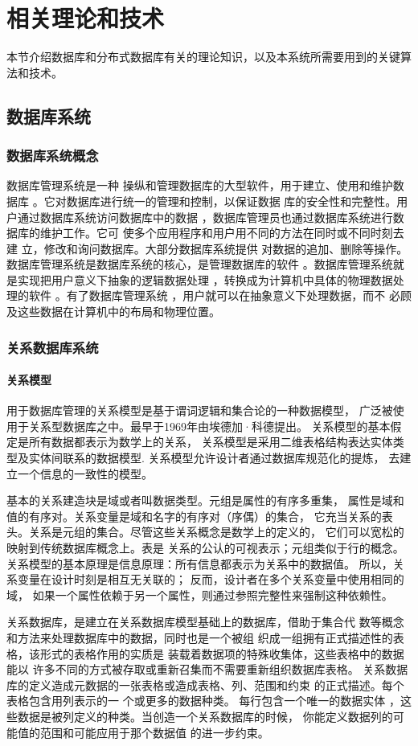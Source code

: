 
\chapter{相关理论和技术}
本节介绍数据库和分布式数据库有关的理论知识，以及本系统所需要用到的关键算法和技术。
\section{数据库系统}
\subsection{数据库系统概念}
数据库管理系统是一种
操纵和管理数据库的大型软件，用于建立、使用和维护数据库
。它对数据库进行统一的管理和控制，以保证数据
库的安全性和完整性。用户通过数据库系统访问数据库中的数据
，数据库管理员也通过数据库系统进行数据库的维护工作。它可
使多个应用程序和用户用不同的方法在同时或不同时刻去建
立，修改和询问数据库。大部分数据库系统提供
对数据的追加、删除等操作。
数据库管理系统是数据库系统的核心，是管理数据库的软件
。数据库管理系统就是实现把用户意义下抽象的逻辑数据处理
，转换成为计算机中具体的物理数据处理的软件
。有了数据库管理系统
，用户就可以在抽象意义下处理数据，而不
必顾及这些数据在计算机中的布局和物理位置。
\subsection{关系数据库系统}
\subsubsection{关系模型}
用于数据库管理的关系模型是基于谓词逻辑和集合论的一种数据模型，
广泛被使用于关系型数据库之中。最早于1969年由埃德加·科德提出。
关系模型的基本假定是所有数据都表示为数学上的关系，
关系模型是采用二维表格结构表达实体类型及实体间联系的数据模型.
关系模型允许设计者通过数据库规范化的提炼，
去建立一个信息的一致性的模型。

基本的关系建造块是域或者叫数据类型。元组是属性的有序多重集，
属性是域和值的有序对。关系变量是域和名字的有序对（序偶）的集合，
它充当关系的表头。关系是元组的集合。尽管这些关系概念是数学上的定义的，
它们可以宽松的映射到传统数据库概念上。表是
关系的公认的可视表示；元组类似于行的概念。
关系模型的基本原理是信息原理：所有信息都表示为关系中的数据值。
所以，关系变量在设计时刻是相互无关联的；
反而，设计者在多个关系变量中使用相同的域，
如果一个属性依赖于另一个属性，则通过参照完整性来强制这种依赖性。

关系数据库，是建立在关系数据库模型基础上的数据库，借助于集合代
数等概念和方法来处理数据库中的数据，同时也是一个被组
织成一组拥有正式描述性的表格，该形式的表格作用的实质是
装载着数据项的特殊收集体，这些表格中的数据能以
许多不同的方式被存取或重新召集而不需要重新组织数据库表格。
关系数据库的定义造成元数据的一张表格或造成表格、列、范围和约束
的正式描述。每个表格包含用列表示的一
个或更多的数据种类。 每行包含一个唯一的数据实体
，这些数据是被列定义的种类。当创造一个关系数据库的时候，
你能定义数据列的可能值的范围和可能应用于那个数据值
的进一步约束。
